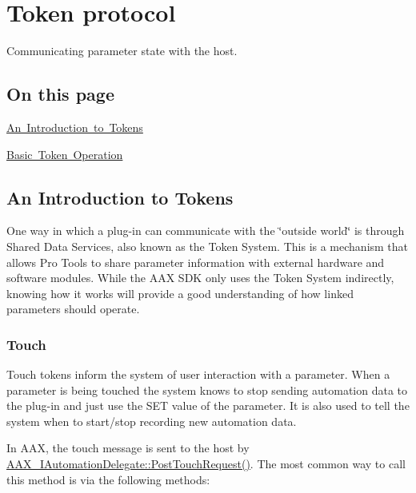 \hypertarget{a00822}{}\section{Token protocol}
\label{a00822}
Communicating parameter state with the host. 

\hypertarget{a00822_advancedTopics_parameterUpdates_tokenProtocol_contents}{}\subsection{On this page}\label{a00822_advancedTopics_parameterUpdates_tokenProtocol_contents}
\begin{DoxyItemize}
\item \mbox{\hyperlink{a00822_tokenProtocol_introductionToTokens}{An Introduction to Tokens}} \item \mbox{\hyperlink{a00822_tokenProtocol_standardTokenOperation}{Basic Token Operation}}\end{DoxyItemize}
 \hypertarget{a00822_tokenProtocol_introductionToTokens}{}\subsection{An Introduction to Tokens}\label{a00822_tokenProtocol_introductionToTokens}
One way in which a plug-\/in can communicate with the \char`\"{}outside world\char`\"{} is through Shared Data Services, also known as the Token System. This is a mechanism that allows Pro Tools to share parameter information with external hardware and software modules. While the A\+AX S\+DK only uses the Token System indirectly, knowing how it works will provide a good understanding of how linked parameters should operate.

\hypertarget{a00822_tokenProtocol_introductionToTokens_touch}{}\subsubsection{Touch}\label{a00822_tokenProtocol_introductionToTokens_touch}
Touch tokens inform the system of user interaction with a parameter. When a parameter is being touched the system knows to stop sending automation data to the plug-\/in and just use the S\+ET value of the parameter. It is also used to tell the system when to start/stop recording new automation data.

In A\+AX, the touch message is sent to the host by \mbox{\hyperlink{a01773_a30fdb67042b8dc9fb42fa9023ed9cce0}{A\+A\+X\+\_\+\+I\+Automation\+Delegate\+::\+Post\+Touch\+Request()}}. The most common way to call this method is via the following methods\+:


